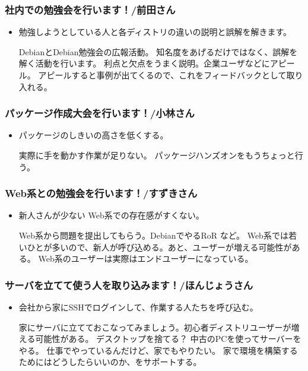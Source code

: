 \documentclass[mingoth,a4paper]{jsarticle}
\begin{document}
\subsubsection{社内での勉強会を行います！/前田さん}
\begin{itemize}
	\item 勉強しようとしている人と各ディストリの違いの説明と誤解を解きます。

	  DebianとDebian勉強会の広報活動。
	  知名度をあげるだけではなく、誤解を解く活動を行います。
	  利点と欠点をうまく説明。企業ユーザなどにアピール。
	  アピールすると事例が出てくるので、これをフィードバックとして取り入れる。
\end{itemize}

	
\subsubsection{パッケージ作成大会を行います！/小林さん}
\begin{itemize}
	\item パッケージのしきいの高さを低くする。
	
	実際に手を動かす作業が足りない。
	パッケージハンズオンをもうちょっと行う。
\end{itemize}

\subsubsection{Web系との勉強会を行います！/すずきさん}
\begin{itemize}
	\item 新人さんが少ない Web系での存在感がすくない。

	Web系から問題を提出してもらう。DebianでやるRoR など。
	Web系では若いひとが多いので、新人が呼び込める。あと、ユーザーが増える可能性がある。
	Web系のユーザーは実際はエンドユーザーになっている。
\end{itemize}

\subsubsection{サーバを立てて使う人を取り込みます！/ほんじょうさん}
\begin{itemize}
	\item 会社から家にSSHでログインして、作業する人たちを呼び込む。

	家にサーバに立てておこなってみましょう。初心者ディストリユーザーが増える可能性がある。
	デスクトップを捨てる？
	中古のPCを使ってサーバーをやる。
	仕事でやっているんだけど、家でもやりたい。
	家で環境を構築するためにはどうしたらいいのか、をサポートする。
\end{itemize}
\end{document}
